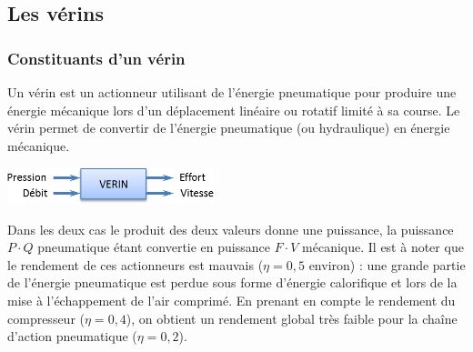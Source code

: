 \documentclass[10pt]{article}
\begin{document}
\begin{minipage}[c]{.53\textwidth}
\subsection{Les vérins}
\subsubsection{Constituants d'un vérin}

Un vérin est un actionneur utilisant de l'énergie pneumatique pour produire une énergie mécanique lors d'un déplacement linéaire ou rotatif limité à sa course. Le vérin permet de convertir de l'énergie pneumatique (ou hydraulique) en énergie mécanique.

\begin{center}
\includegraphics[width=6cm]{images/fig1}
\end{center}

Dans les deux cas le produit des deux valeurs donne une puissance, la puissance $P\cdot Q$ pneumatique étant convertie en puissance $F\cdot V$ mécanique. Il est à noter que le rendement de ces actionneurs est mauvais ($\eta =0,5$ environ) : une grande partie de l'énergie pneumatique est perdue sous forme d'énergie calorifique et lors de la mise à l'échappement de l'air comprimé. En prenant en compte le rendement du compresseur ($\eta =0,4$), on obtient un rendement global très faible pour la chaîne d'action pneumatique ($\eta =0,2$).

\end{minipage} \hfill
\end{document}
